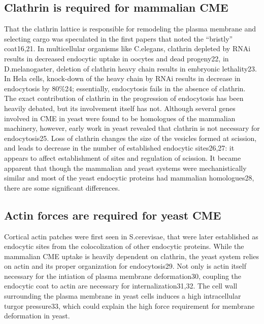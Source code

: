 		\subsection{Clathrin is required for mammalian CME}
		That the clathrin lattice is responsible for remodeling the plasma membrane and selecting cargo was speculated in the first papers that noted the “bristly” coat16,21.  In multicellular organisms like C.elegans, clathrin depleted by RNAi results in decreased endocytic uptake in oocytes and dead progeny22, in D.melanogaster, deletion of clathrin heavy chain results in embryonic lethality23. In Hela cells, knock-down of the heavy chain by RNAi results in decrease in endocytosis by 80\%24; essentially, endocytosis fails in the absence of clathrin. The exact contribution of clathrin in the progression of endocytosis has been heavily debated, but its involvement itself has not. Although several genes involved in CME in yeast were found to be homologues of the mammalian machinery, however, early work in yeast revealed that clathrin is not necessary for endocytosis25. Loss of clathrin changes the size of the vesicles formed at scission, and leads to decrease in the number of established endocytic sites26,27: it appears to affect establishment of sites and regulation of scission. It became apparent that though the mammalian and yeast systems were mechanistically similar and most of the yeast endocytic proteins had mammalian homologues28, there are some significant differences.


		\subsection{Actin forces are required for yeast CME}
		Cortical actin patches were first seen in S.cerevisae, that were later established as endocytic sites from the colocolization of other endocytic proteins. While the mammalian CME uptake is heavily dependent on clathrin, the yeast system relies on actin and its proper organization for endocytosis29. Not only is actin itself necessary for the intiation of plasma membrane deformation30, coupling the endocytic coat to actin are necessary for internalization31,32.  The cell wall surrounding the plasma membrane in yeast cells induces a high intracellular turgor pressure33, which could explain the high force requirement for membrane deformation in yeast. 


	

